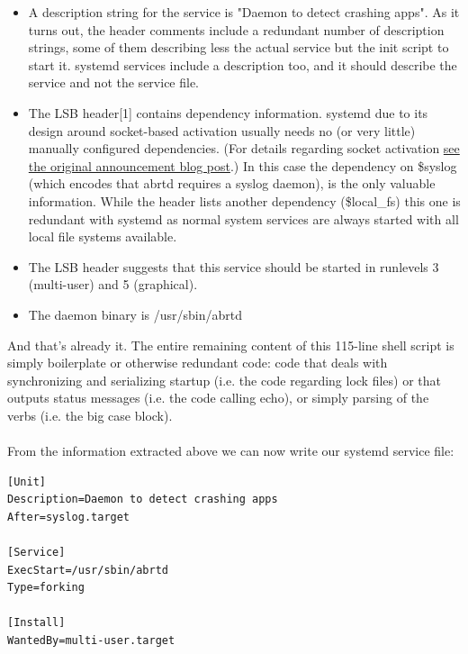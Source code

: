 \documentclass[titlepage]{article}
\begin{document}
\begin{itemize}
\item A description string for the service is "Daemon to detect crashing apps". As it turns out, the header comments include a redundant number of description strings, some of them describing less the actual service but the init script to start it. systemd services include a description too, and it should describe the service and not the service file.
\item The LSB header[1] contains dependency information. systemd due to its design around socket-based activation usually needs no (or very little) manually configured dependencies. (For details regarding socket activation \href{https://0pointer.de/blog/projects/systemd.html}{see the original announcement blog post}.) In this case the dependency on \$syslog (which encodes that abrtd requires a syslog daemon), is the only valuable information. While the header lists another dependency (\$local\_fs) this one is redundant with systemd as normal system services are always started with all local file systems available.
\item The LSB header suggests that this service should be started in runlevels 3 (multi-user) and 5 (graphical).
\item The daemon binary is /usr/sbin/abrtd
\end{itemize}
And that's already it. The entire remaining content of this 115-line shell script is simply boilerplate or otherwise redundant code: code that deals with synchronizing and serializing startup (i.e. the code regarding lock files) or that outputs status messages (i.e. the code calling echo), or simply parsing of the verbs (i.e. the big case block).
\\
\\
From the information extracted above we can now write our systemd service file:
\begin{lstlisting}
[Unit]
Description=Daemon to detect crashing apps
After=syslog.target

[Service]
ExecStart=/usr/sbin/abrtd
Type=forking

[Install]
WantedBy=multi-user.target
\end{lstlisting}
\end{document}
